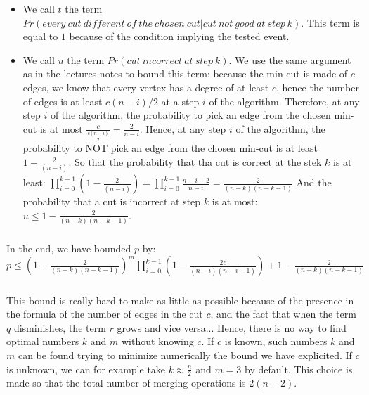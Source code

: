 \begin{itemize}
\item We call $t$ the term $Pr(every\: cut\: different\: of\: the\: chosen\: cut | cut\: not\: good\: at\: step\: k)$.
\newline
This term is equal to $1$ because of the condition implying the tested event.
\item We call $u$ the term $Pr(cut\: incorrect\: at\: step\: k)$.
\newline
We use the same argument as in the lectures notes to bound this term: because the min-cut is made of $c$ edges, we know that every vertex has a degree of at least $c$, hence the number of edges is at least $c(n-i)/2$ at a step $i$ of the algorithm.
\newline
Therefore, at any step $i$ of the algorithm, the probability to pick an edge from the chosen min-cut is at most $\frac{c}{\frac{c(n-i)}{2}}=\frac{2}{n-i}$.
\newline
Hence, at any step $i$ of the algorithm, the probability to NOT pick an edge from the chosen min-cut is at least $1-\frac{2}{(n-i)}$.
\newline
So that the probability that tha cut is correct at the stek $k$ is at least:
\newline
$\prod_{i=0}^{k-1}{(1-\frac{2}{(n-i)})} = \prod_{i=0}^{k-1}{\frac{n-i-2}{n-i}} = \frac{2}{(n-k)(n-k-1)}$
\newline
And the probability that a cut is incorrect at step $k$ is at most:
\newline
$u \leq 1 -  \frac{2}{(n-k)(n-k-1)}$.
\end{itemize}
\subparagraph{}
In the end, we have bounded $p$ by:
\newline
$p \leq (1 - \frac{2}{(n-k)(n-k-1)})^m \prod_{i=0}^{k-1}{(1-\frac{2c}{(n-i)(n-i-1)})} + 1 -  \frac{2}{(n-k)(n-k-1)}$
\subparagraph{}
This bound is really hard to make as little as possible because of the presence in the formula of the number of edges in the cut $c$, and the fact that when the term $q$ disminishes, the term $r$ grows and vice versa...
\newline
Hence, there is no way to find optimal numbers $k$ and $m$ without knowing $c$. If $c$ is known, such numbers $k$ and $m$ can be found trying to minimize numerically the bound we have explicited.
\newline
If $c$ is unknown, we can for example take $k \approx \frac{n}{2}$ and $m = 3$ by default. This choice is made so that the total number of merging operations is $2(n-2)$.